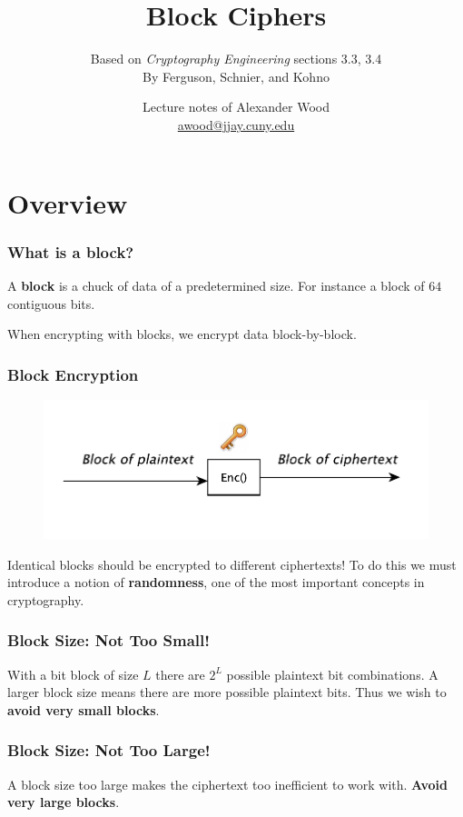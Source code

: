\documentclass{beamer}
\title[Block Ciphers]{Block Ciphers}
\subtitle{Based on \emph{Cryptography Engineering} sections 3.3, 3.4 \\ By Ferguson, Schnier, and Kohno}
\author
{Lecture notes of Alexander Wood \\ \scriptsize \href{mailto:awood@jjay.cuny.edu}{awood@jjay.cuny.edu}}
\institute[JJay]{John Jay College of Criminal Justice}
\date{}
\newcommand{\<}{\langle}
\renewcommand{\>}{\rangle}
\begin{document}

\begin{frame}
  \titlepage
\end{frame}

\section{Overview}


\begin{frame}
\frametitle{What is a block?}

A \textbf{block} is a chuck of data of a predetermined size. For instance a block of $64$ contiguous bits.  \newline

When encrypting with blocks, we encrypt data block-by-block.
\end{frame}


\begin{frame}
\frametitle{Block Encryption}

\begin{figure}
\includegraphics[scale=.6]{IMG/blockencrypt.pdf}
\end{figure}
Identical blocks should be encrypted to different ciphertexts! To do this we must introduce a notion of \textbf{randomness}, one of the most important concepts in cryptography. 
\end{frame}

\begin{frame}
\frametitle{Block Size: Not Too Small!}

With a bit block of size $L$ there are $2^L$ possible plaintext bit combinations. A larger block size means there are more possible plaintext bits. Thus we wish to \textbf{avoid very small blocks}. 
\end{frame}


\begin{frame}
\frametitle{Block Size: Not Too Large!}
A block size too large makes the ciphertext too inefficient to work with. \textbf{Avoid very large blocks}. 
\end{frame}
\end{document}
